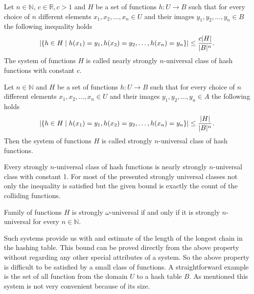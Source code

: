 \begin{definition}
\label{nearly_strong_universal_n_system}
Let $n \in \mathbb{N}$, $c \in \mathbb{R}, c > 1$ and $H$ be a set of functions $h: U \rightarrow B$ such that for every choice of $n$ different elements $x_1, x_2, \dots, x_n \in U$ and their images $y_1, y_2, \dots, y_n \in B$ the following inequality holds
\[ 
	\left|\lbrace h \in H \mid h(x_1) = y_1, h(x_2) = y_2, \dots, h(x_n) = y_n \rbrace \right| \leq \frac{c|H|}{|B|^n} \textit{.} 
\] 
The system of functions $H$ is called nearly strongly $n$-universal class of hash functions with constant $c$.
\end{definition}

\begin{definition}
\label{strong_universal_n_system}
Let $n \in \mathbb{N}$ and $H$ be a set of functions $h: U \rightarrow B$ such that for every choice of $n$ different elements $x_1, x_2, \dots, x_n \in U$ and their images $y_1, y_2, \dots, y_n \in A$ the following holds \[ \left|\lbrace h \in H \mid h(x_1) = y_1, h(x_2) = y_2, \dots, h(x_n) = y_n \rbrace \right| \leq \frac{|H|}{|B|^n} \textit{.} \] Then the system of functions $H$ is called strongly $n$-universal class of hash functions.
\end{definition}

Every strongly $n$-universal class of hash functions is nearly strongly $n$-universal class with constant 1. For most of the presented strongly universal classes not only the inequality is satisfied but the given bound is exactly the count of the colliding functions.

\begin{definition}
\label{strong_universal_omega_system}
Family of functions $H$ is strongly $\omega$-universal if and only if it is strongly $n$-universal for every $n \in \mathbb{N}$.
\end{definition}

Such systems provide us with and estimate of the length of the longest chain in the hashing table. This bound can be proved directly from the above property without regarding any other special attributes of a system. So the above property is difficult to be satisfied by a small class of functions. A straightforward example is the set of all function from the domain $U$ to a hash table $B$. As mentioned this system is not very convenient because of its size.


